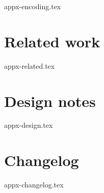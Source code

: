 \documentclass{article}
\begin{document}
{appx-encoding.tex}

\newpage
\section{Related work}
\label{appx:related}

{appx-related.tex}

\newpage
\section{Design notes}
\label{appx:design}

{appx-design.tex}

\newpage
\section{Changelog}
\label{appx:changelog}

{appx-changelog.tex}

\end{document}
